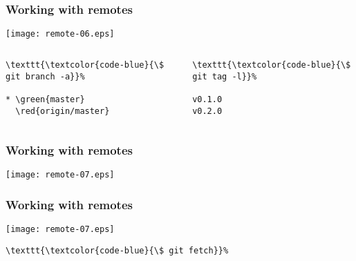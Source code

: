 \documentclass[english]{beamer}
\newcommand{\CMD}[1]{%
\texttt{\textcolor{code-blue}{#1}}%
}
\newcommand{\green}[1]{%
\textcolor{code-green}{#1}%
}
\newcommand{\red}[1]{%
\textcolor{code-red}{#1}%
}
\begin{document}
\begin{frame}[fragile]
\frametitle{Working with remotes}

\texttt{[image: remote-06.eps]}

\begin{columns}[t]
        \begin{column}[T]{.5\textwidth}
{\tiny
\begin{Verbatim}[commandchars=\\\{\}]
\CMD{\$ git branch -a}
* \green{master}
  \red{origin/master}
\end{Verbatim}
}

        \end{column}
        \begin{column}[T]{.5\textwidth}

{\tiny
\begin{Verbatim}[commandchars=\\\{\}]
\CMD{\$ git tag -l}
v0.1.0
v0.2.0
\end{Verbatim}
}
        \end{column}
\end{columns}

\vspace{\textheight}
\end{frame}

\begin{frame}[fragile]
\frametitle{Working with remotes}

\texttt{[image: remote-07.eps]}

\vspace{\textheight}
\end{frame}

\begin{frame}[fragile]
\frametitle{Working with remotes}

\texttt{[image: remote-07.eps]}

\begin{Verbatim}[commandchars=\\\{\}]
\CMD{\$ git fetch}
\end{Verbatim}
\vspace{\textheight}
\end{frame}
\end{document}
